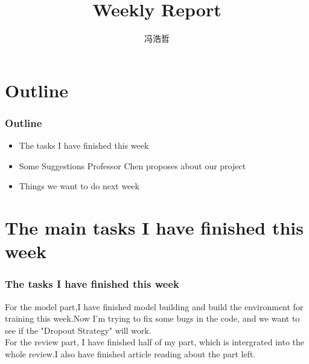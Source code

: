 \documentclass[8pt]{beamer}
\title{Weekly Report}
\author{冯浩哲}
\begin{document}
	\frame{\titlepage}
		
	
	\section*{Outline}	

\begin{frame}[fragile]
\frametitle{Outline}
\begin{itemize}  
	
\item  The tasks I have finished this week
\vspace{.5cm} 
\item  Some Suggestions Professor Chen proposes about our project
\vspace{.5cm}
\item  Things we want to do next week
\vspace{.5cm}

\end{itemize}
\end{frame}

\section*{The main tasks I have finished this week}	
\begin{frame}[fragile]
\frametitle{The tasks I have finished this week}
For the model part,I have finished model building and build the environment for training this week.Now I'm trying to fix some bugs in the code, and we want to see if the "Dropout Strategy" will work.\\
\vspace{.5cm}
For the review part, I have finished half of my part, which is intergrated into the whole review.I also have finished article reading about the part left. 
\vspace{.3cm}
\end{frame}
\end{document}
